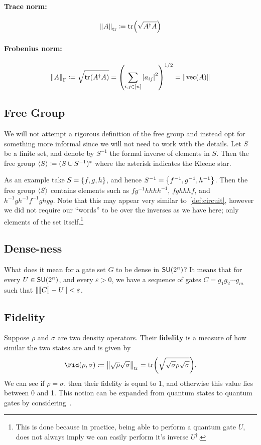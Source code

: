 \paragraph{Trace norm:}
\begin{equation}
    \norm{A}_\text{tr} \coloneqq \tr(\sqrt{A^\dagger A})
\end{equation}

\paragraph{Frobenius norm:}
\begin{equation}
    \norm{A}_\text{F} \coloneqq \sqrt{\tr(A^\dagger A)} = \qty(\sum_{i, j \in [n]}\abs{a_{ij}}^2)^{1/2} = \norm{\operatorname{vec}(A)}
\end{equation}


\subsection{Free Group}
We will not attempt a rigorous definition of the free group and instead opt for something more informal since we will not need to work with the details.
Let $S$ be a finite set, and denote by $S^{-1}$ the formal inverse of elements in $S$.
Then the free group $\expval{S} \coloneqq (S\cup S^{-1})^*$ where the asterisk indicates the Kleene star.

As an example take $S = \qty{f, g, h}$, and hence $S^{-1} = \qty{f^{-1}, g^{-1}, h^{-1}}$.
Then the free group $\expval{S}$ contains elements such as $fg^{-1}hhhh^{-1}$, $fghhhf$, and $h^{-1}gh^{-1}f^{-1}ghgg$.
Note that this may appear very similar to~\cref{def:circuit}, however we did not require our ``words'' to be over the inverses as we have here; only elements of the set itself.\footnote{This is done because in practice, being able to perform a quantum gate $U$, does not always imply we can easily perform it's inverse $U^\dagger$.} %

\subsection{Dense-ness}

What does it mean for a gate set $G$ to be dense in $\mathsf{SU} (2^n)$?
It means that for every $U \in \mathsf{SU} (2^n)$, and every $\varepsilon > 0$, we have a sequence of gates $C = g_1g_2\cdots g_m$ such that $\norm{\llbracket C\rrbracket - U} < \varepsilon$.

\subsection{Fidelity}

Suppose $\rho$ and $\sigma$ are two density operators.
Their \textbf{fidelity} is a measure of how similar the two states are and is given by
\begin{equation}
    \Fid(\rho, \sigma) \defeq \norm{\sqrt{\rho}\sqrt{\sigma}}_\text{tr} = \tr(\sqrt{\sqrt{\sigma}\rho\sqrt{\sigma}}).
\end{equation}
We can see if $\rho = \sigma$, then their fidelity is equal to 1, and otherwise this value lies between 0 and 1.
This notion can be expanded from quantum states to quantum gates by considering~\cite{fidelity}.
